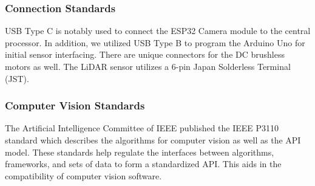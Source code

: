 \subsubsection{Connection Standards}
\noindent USB Type C is notably used to connect the ESP32 Camera module to the central processor. In addition, we utilized USB Type B to program the Arduino Uno for initial sensor interfacing. There are unique connectors for the DC brushless motors as well. The LiDAR sensor utilizes a 6-pin Japan Solderless Terminal (JST).

\subsubsection{Computer Vision Standards}
\noindent The Artificial Intelligence Committee of IEEE published the IEEE P3110 standard which describes the algorithms for computer vision as well as the API model. These standards help regulate the interfaces between algorithms, frameworks, and sets of data to form a standardized API. This aids in the compatibility of computer vision software. \cite{ieeep3110}

